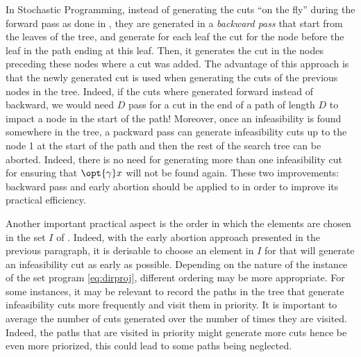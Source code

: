 \documentclass[11pt,twoside,a4paper,openright]{uclouvain-thesis}
\begin{document}
In Stochastic Programming, instead of generating the cuts ``on the fly'' during the forward pass as done in , they are
generated in a \emph{backward pass} that start from the leaves of the tree, and generate for each leaf the cut for the node before the leaf in the path ending at this leaf.
Then, it generates the cut in the nodes preceding these nodes where a cut was added.
The advantage of this approach is that the newly generated cut is used when
generating the cuts of the previous nodes in the tree.
Indeed, if the cuts where generated forward instead of backward, we would need
$D$ pass for a cut in the end of a path of length $D$ to impact a node in the
start of the path!
Moreover, once an infeasibility is found somewhere in the tree,
a packward pass can generate infeasibility cuts up to the node 1 at the start of the path
and then the rest of the search tree can be aborted.
Indeed, there is no need for generating more than one infeasibility cut for ensuring
that $\opt{\gamma} x$ will not be found again.
These two improvements: backward pass and early abortion should be applied to
 in order to improve its practical efficiency.

Another important practical aspect is the order in which the elements are
chosen in the set $I$ of .
Indeed, with the early abortion approach presented in the previous paragraph,
it is derisable to choose an element in $I$ for that will generate an infeasibility
cut as early as possible.
Depending on the nature of the instance of the set program \eqref{eq:dirproj},
different ordering may be more appropriate.
For some instances, it may be relevant to record the paths in the tree that generate infeasibility cuts more frequently and visit them in priority.
It is important to average the number of cuts generated over the number of times they are visited.
Indeed, the paths that are visited in priority might generate more cuts hence be even more priorized, this could lead to some paths being neglected.
\end{document}
